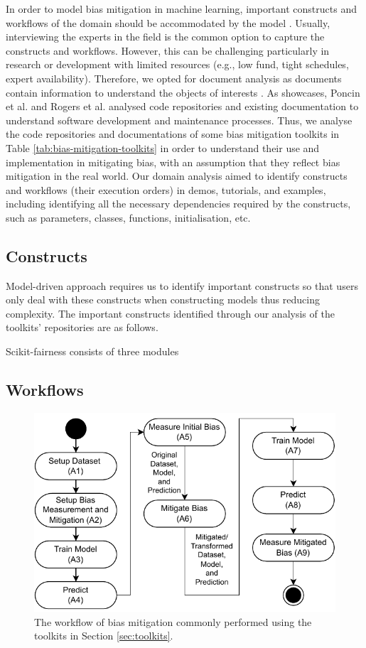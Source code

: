 \documentclass[final,5p,times,twocolumn]{elsarticle}
\begin{document}
In order to model bias mitigation in machine learning, important constructs and workflows of the domain should be accommodated by the model \cite{volter2013model}. Usually, interviewing the experts in the field is the common option to capture the constructs and workflows. However, this can be challenging particularly in research or development with limited resources (e.g., low fund, tight schedules, expert availability). Therefore, we opted for document analysis as documents contain information to understand the objects of interests \cite{bowen2009document}. As showcases, Poncin et al. \cite{poncin2011process} and Rogers et al. \cite{rogers2015using} analysed code repositories and existing documentation to understand software development and maintenance processes. Thus, we analyse the code repositories and documentations of some bias mitigation toolkits in Table \ref{tab:bias-mitigation-toolkits} in order to understand their use and implementation in mitigating bias, with an assumption that they reflect bias mitigation in the real world. Our domain analysis aimed to identify constructs and workflows (their execution orders) in demos, tutorials, and examples, including identifying all the necessary dependencies required by the constructs, such as parameters, classes, functions, initialisation, etc.

\subsection{Constructs}
\label{sec:constructs}
Model-driven approach requires us to identify important constructs so that users only deal with these constructs when constructing models thus reducing complexity. The important constructs identified through our analysis of the toolkits' repositories are as follows. 

Scikit-fairness consists of three modules

\subsection{Workflows}
\label{sec:workflows}

\begin{figure}
	\includegraphics[width=\linewidth]{figures/workflow}
	\caption{The workflow of bias mitigation commonly performed using the toolkits in Section \ref{sec:toolkits}.}
	\label{fig:workflow}
\end{figure}
\end{document}
